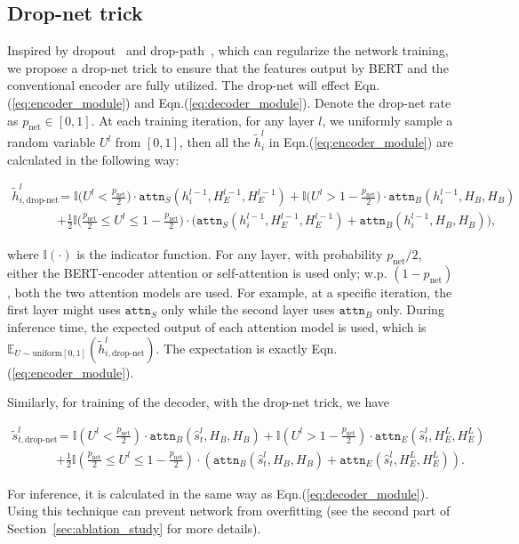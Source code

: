 \documentclass{article} \usepackage{iclr2020_conference,times}
\newcommand{\attn}{\texttt{attn}}
\newcommand{\myeqref}[1]{Eqn.(\ref{#1})}
\begin{document}
\subsection{Drop-net trick}
Inspired by dropout~\citep{srivastava2014dropout} and drop-path~\citep{larsson2017fractalnet}, which can regularize the network training, we propose a drop-net trick to ensure that the features output by BERT and the conventional encoder are fully utilized. The drop-net will effect \myeqref{eq:encoder_module} and \myeqref{eq:decoder_module}. Denote the drop-net rate as $p_{\text{net}}\in[0,1]$. At each training iteration, for any layer $l$, we uniformly sample a random variable $U^l$ from $[0,1]$, then all the $\tilde{h}^l_i$ in \myeqref{eq:encoder_module} are calculated in the following way:
\begin{small}
\begin{equation}
\begin{aligned}
\tilde{h}^l_{i,\text{drop-net}}& =\mathbb{I}\big(U^l<\frac{p_{\text{net}}}{2}\big)\cdot\attn_S(h^{l-1}_i,H^{l-1}_E,H^{l-1}_E) + \mathbb{I}\big(U^l>1-\frac{p_{\text{net}}}{2}\big)\cdot\attn_B(h^{l-1}_i,H_B,H_B)\\
& + \frac{1}{2}\mathbb{I}\big(\frac{p_{\text{net}}}{2} \le U^l \le 1-\frac{p_{\text{net}}}{2}\big)\cdot\big(\attn_S(h^{l-1}_i,H^{l-1}_E,H^{l-1}_E) + \attn_B(h^{l-1}_i,H_B,H_B)\big),
\end{aligned}
\label{eq:encoder_module_dropnet_training}
\end{equation}
\end{small}
where $\mathbb{I}(\cdot)$ is the indicator function. For any layer, with probability $p_{\text{net}}/2$, either the BERT-encoder attention or self-attention is used only; w.p. $(1-p_{\text{net}})$, both the two attention models are used. For example, at a specific iteration, the first layer might uses $\attn_S$ only while the second layer uses $\attn_B$ only. During inference time, the expected output of each attention model is used, which is $\mathbb{E}_{U\sim\text{uniform}[0,1]}(\tilde{h}^l_{i,\text{drop-net}})$. The expectation is exactly \myeqref{eq:encoder_module}.

Similarly, for training of the decoder, with the drop-net trick, we have 
\begin{small}
\begin{equation}
\begin{aligned}
\tilde{s}^l_{t,\text{drop-net}}&=\mathbb{I}(U^l<\frac{p_{\text{net}}}{2})\cdot\attn_B(\hat{s}^l_{t}, H_B,H_B)+\mathbb{I}(U^l>1-\frac{p_{\text{net}}}{2})\cdot\attn_E(\hat{s}^l_{t}, H_E^L,H_E^L) \\
&+\frac{1}{2}\mathbb{I}(\frac{p_{\text{net}}}{2}\le U^l \le 1-\frac{p_{\text{net}}}{2})\cdot(\attn_B(\hat{s}^l_{t}, H_B,H_B)+\attn_E(\hat{s}^l_{t}, H_E^L,H_E^L)).
\end{aligned}
\label{eq:decoder_module_dropnet_training}
\end{equation}
\end{small}
For inference, it is calculated in the same way as \myeqref{eq:decoder_module}. Using this technique can prevent network from overfitting (see the second part of Section~\ref{sec:ablation_study} for more details).
\end{document}
